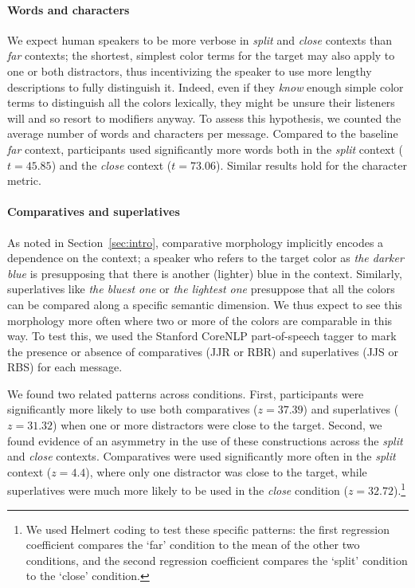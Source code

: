 \documentclass[11pt,letterpaper]{article}
\newcommand{\word}{\textit}
\renewcommand{\|}{\mid}
\newcommand{\secref}[1]{Section~\ref{#1}}
\newcommand{\cond}{\emph}
\begin{document}
\paragraph{Words and characters}
We expect human speakers to be more verbose in \cond{split} and \cond{close}
contexts than \cond{far} contexts; the shortest, simplest color terms for the target
may also apply to one or both distractors, thus incentivizing the speaker to use more
lengthy descriptions to fully distinguish it. Indeed, even if they \emph{know}
enough simple color terms to distinguish all the colors
lexically, they might be unsure their listeners will and so
resort to modifiers anyway. To assess this hypothesis,
we counted the average number of words and characters per message.
Compared to the baseline \cond{far} context, participants used significantly more words both in the \cond{split} context ($t =  45.85$) and the \cond{close} context ($t = 73.06$). Similar results hold for the character metric.

\paragraph{Comparatives and superlatives}
As noted in \secref{sec:intro}, comparative morphology implicitly
encodes a dependence on the context; a speaker who refers to the
target color as \word{the darker blue} is presupposing that there is
another (lighter) blue in the context. Similarly, superlatives like
\word{the bluest one} or \word{the lightest one} presuppose that all
the colors can be compared along a specific semantic dimension. We
thus expect to see this morphology more often where two or more of the
colors are comparable in this way. To test this, we used the Stanford
CoreNLP part-of-speech tagger \cite{Toutanova2003} to mark the presence or absence of comparatives (JJR or RBR) and superlatives (JJS or RBS) for each message.

We found two related patterns across conditions. First, participants were significantly
more likely to use both comparatives ($z = 37.39$) and superlatives ($z = 31.32$)
when one or more distractors were close to the target. Second, we found evidence of
an asymmetry in  the use of these constructions across the \cond{split} and
\cond{close} contexts. Comparatives were used significantly more often in the
\cond{split} context ($z = 4.4$), where only one distractor was close to the target,
while superlatives were much more likely to be used in the \cond{close} condition
($z = 32.72$).\footnote{We used Helmert coding to test these specific patterns: the first regression coefficient compares the `far' condition to the mean of the other two conditions, and the second regression coefficient compares the `split' condition to the `close' condition.}
\end{document}
